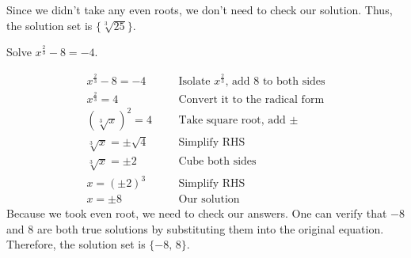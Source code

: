 Since we didn't take any even roots, we don't need to check our solution. Thus, the solution set is $\{\sqrt[3]{25}\}$.
\vspace{0.4cm}
\begin{exa}
        Solve $x^{\frac{2}{3}}-8=-4$.
\end{exa}
\begin{align*}
        x^{\frac{2}{3}}-8=-4&  &   &\text{Isolate $x^{\frac{2}{3}}$, add 8 to both sides}\\
        x^{\frac{2}{3}}=4&  &   &\text{Convert it to the radical form}\\
        \left(\sqrt[3]{x}\right)^2=4&  &   &\text{Take square root, add $\pm$}\\
        \sqrt[3]{x}=\pm \sqrt{4}&  &   &\text{Simplify RHS}\\
        \sqrt[3]{x}=\pm 2&  &   &\text{Cube both sides}\\
        x=\left(\pm 2\right)^3&  &   &\text{Simplify RHS}\\
        x = \pm 8&              &   &\text{Our solution}
\end{align*}
Because we took even root, we need to check our answers. One can verify that $-8$ and $8$ are both true solutions by substituting them into the original equation. Therefore, the solution set is $\{-8,\,8\}$.
